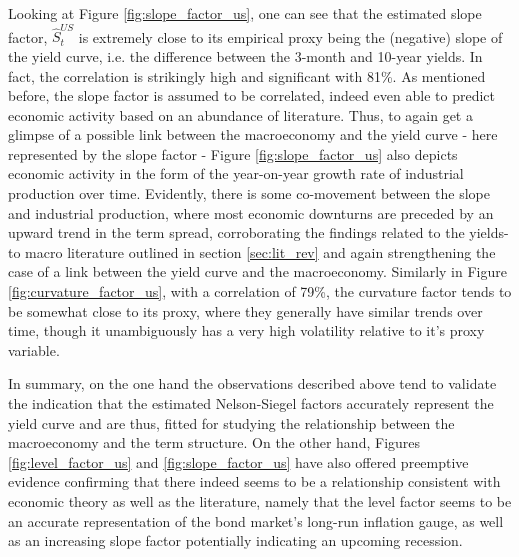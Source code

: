 Looking at Figure \ref{fig:slope_factor_us}, one can see that the estimated slope factor, $\hat{S}^{US}_{t}$ is extremely close to its empirical proxy being the (negative) slope of the yield curve, i.e. the difference between the 3-month and 10-year yields. 
In fact, the correlation is strikingly high and significant with 81\%.  
As mentioned before, the slope factor is assumed to be correlated, indeed even able to predict economic activity based on an abundance of literature. 
Thus, to again get a glimpse of a possible link between the macroeconomy and the yield curve - here represented by the slope factor - Figure \ref{fig:slope_factor_us} also depicts economic activity in the form of the year-on-year growth rate of industrial production over time. 
Evidently, there is some co-movement between the slope and industrial production, where most economic downturns are preceded by an upward trend in the term spread, corroborating the findings related to the yields-to macro literature outlined in section \ref{sec:lit_rev} and again strengthening the case of a link between the yield curve and the macroeconomy. 
Similarly in Figure \ref{fig:curvature_factor_us}, with a correlation of 79\%, the curvature factor tends to be somewhat close to its proxy, where they generally have similar trends over time, though it unambiguously has a very high volatility relative to it's proxy variable. 

In summary, on the one hand the observations described above tend to validate the indication that the estimated Nelson-Siegel factors accurately represent the yield curve and are thus, fitted for studying the relationship between the macroeconomy and the term structure. On the other hand, Figures \ref{fig:level_factor_us} and \ref{fig:slope_factor_us} have also offered preemptive evidence confirming that there indeed seems to be a relationship consistent with economic theory as well as the literature, namely that the level factor seems to be an accurate representation of the bond market's long-run inflation gauge, as well as an increasing slope factor potentially indicating an upcoming recession.

